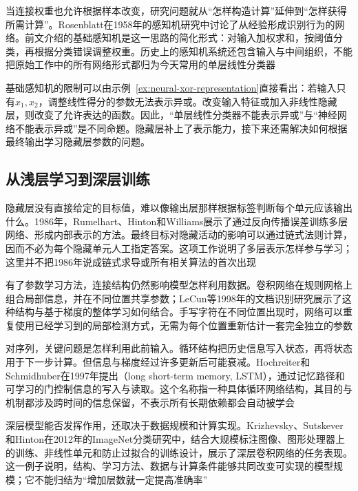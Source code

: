 当连接权重也允许根据样本改变，研究问题就从“怎样构造计算”延伸到“怎样获得所需计算”。Rosenblatt在1958年的感知机研究中讨论了从经验形成识别行为的网络。前文介绍的基础感知机是这一思路的简化形式：对输入加权求和，按阈值分类，再根据分类错误调整权重。历史上的感知机系统还包含输入与中间组织，不能把原始工作中的所有网络形式都归为今天常用的单层线性分类器

基础感知机的限制可以由示例~\ref{ex:neural-xor-representation}直接看出：若输入只有$x_1,x_2$，调整线性得分的参数无法表示异或。改变输入特征或加入非线性隐藏层，则改变了允许表达的函数。因此，“单层线性分类器不能表示异或”与“神经网络不能表示异或”是不同命题。隐藏层补上了表示能力，接下来还需解决如何根据最终输出学习隐藏层参数的问题。

\subsection{从浅层学习到深层训练}
\label{sec:neural-history-deep-training}

隐藏层没有直接给定的目标值，难以像输出层那样根据标签判断每个单元应该输出什么。1986年，Rumelhart、Hinton和Williams展示了通过反向传播误差训练多层网络、形成内部表示的方法。最终目标对隐藏活动的影响可以通过链式法则计算，因而不必为每个隐藏单元人工指定答案。这项工作说明了多层表示怎样参与学习；这里并不把1986年说成链式求导或所有相关算法的首次出现

有了参数学习方法，连接结构仍然影响模型怎样利用数据。卷积网络在规则网格上组合局部信息，并在不同位置共享参数；LeCun等1998年的文档识别研究展示了这种结构与基于梯度的整体学习如何结合。手写字符在不同位置出现时，网络可以重复使用已经学习到的局部检测方式，无需为每个位置重新估计一套完全独立的参数

对序列，关键问题是怎样利用此前输入。循环结构把历史信息写入状态，再将状态用于下一步计算。但信息与梯度经过许多更新后可能衰减。Hochreiter和Schmidhuber在1997年提出（long short-term memory, LSTM），通过记忆路径和可学习的门控制信息的写入与读取。这个名称指一种具体循环网络结构，其目的与机制都涉及跨时间的信息保留，不表示所有长期依赖都会自动被学会

深层模型能否发挥作用，还取决于数据规模和计算实现。Krizhevsky、Sutskever和Hinton在2012年的ImageNet分类研究中，结合大规模标注图像、图形处理器上的训练、非线性单元和防止过拟合的训练设计，展示了深层卷积网络的任务表现。这一例子说明，结构、学习方法、数据与计算条件能够共同改变可实现的模型规模；它不能归结为“增加层数就一定提高准确率”

